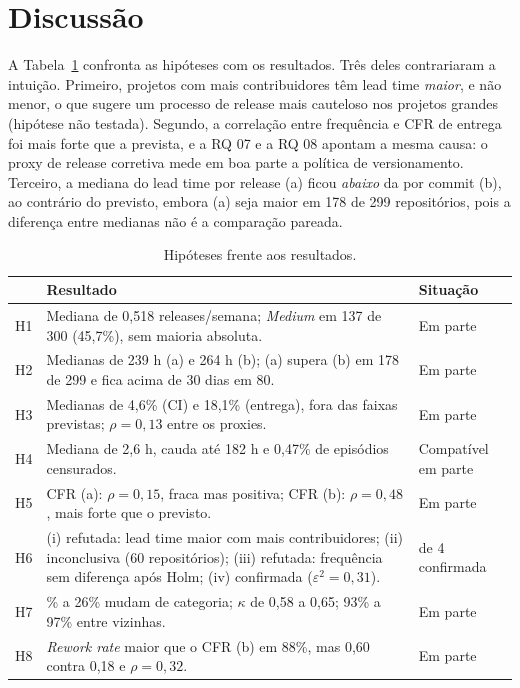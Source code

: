 \documentclass[12pt]{article}
\begin{document}
\section{Discussão}
\label{sec:discussao}

A Tabela~\ref{tab:hipoteses} confronta as hipóteses com os resultados. Três deles contrariaram a intuição. Primeiro, projetos com mais contribuidores têm lead time \emph{maior}, e não menor, o que sugere um processo de release mais cauteloso nos projetos grandes (hipótese não testada). Segundo, a correlação entre frequência e CFR de entrega foi mais forte que a prevista, e a RQ 07 e a RQ 08 apontam a mesma causa: o proxy de release corretiva mede em boa parte a política de versionamento. Terceiro, a mediana do lead time por release (a) ficou \emph{abaixo} da por commit (b), ao contrário do previsto, embora (a) seja maior em 178 de 299 repositórios, pois a diferença entre medianas não é a comparação pareada.

\begin{table}[!t]
\centering
\footnotesize
\setlength{\tabcolsep}{3pt}
\caption{Hipóteses frente aos resultados.}
\label{tab:hipoteses}
\begin{tabular}{>{\raggedright\arraybackslash}p{0.8cm}>{\raggedright\arraybackslash}p{11.9cm}>{\raggedright\arraybackslash}p{2.3cm}}
\toprule
 & Resultado & Situação \\
\midrule
H1 & Mediana de 0,518 releases/semana; \emph{Medium} em 137 de 300 (45,7\%), sem maioria absoluta. & Em parte \\
H2 & Medianas de 239 h (a) e 264 h (b); (a) supera (b) em 178 de 299 e fica acima de 30 dias em 80. & Em parte \\
H3 & Medianas de 4,6\% (CI) e 18,1\% (entrega), fora das faixas previstas; $\rho=0{,}13$ entre os proxies. & Em parte \\
H4 & Mediana de 2,6 h, cauda até 182 h e 0,47\% de episódios censurados. & Compatível em parte \\
H5 & CFR (a): $\rho=0{,}15$, fraca mas positiva; CFR (b): $\rho=0{,}48$, mais forte que o previsto. & Em parte \\
H6 & (i) refutada: lead time maior com mais contribuidores; (ii) inconclusiva (60 repositórios); (iii) refutada: frequência sem diferença após Holm; (iv) confirmada ($\varepsilon^2=0{,}31$). & 1 de 4 confirmada \\
H7 & 24\% a 26\% mudam de categoria; $\kappa$ de 0,58 a 0,65; 93\% a 97\% entre vizinhas. & Em parte \\
H8 & \emph{Rework rate} maior que o CFR (b) em 88\%, mas 0,60 contra 0,18 e $\rho=0{,}32$. & Em parte \\
\bottomrule
\end{tabular}
\end{table}
\end{document}
